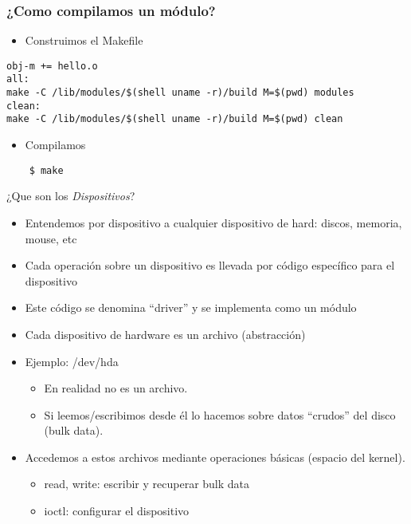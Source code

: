 \begin{frame}[fragile]
\frametitle{¿Como compilamos un módulo?}
  \begin{itemize}
  \item Construimos el Makefile
  \end{itemize}
\begin{lstlisting}
obj-m += hello.o
all:
make -C /lib/modules/$(shell uname -r)/build M=$(pwd) modules
clean:
make -C /lib/modules/$(shell uname -r)/build M=$(pwd) clean
\end{lstlisting}
  \begin{itemize}
  \item Compilamos
  \end{itemize}
\begin{lstlisting}
    $ make
\end{lstlisting}

\end{frame}

\begin{frame}{¿Que son los \textit{Dispositivos}?}
  \begin{itemize}
	\item Entendemos por dispositivo a cualquier dispositivo de hard: discos, memoria, mouse, etc
	\item Cada operación sobre un dispositivo es llevada por código específico para el dispositivo
	\item Este código se denomina “driver” y se implementa como un módulo
        \item Cada dispositivo de hardware es un archivo (abstracción)
 	\item Ejemplo: /dev/hda
	\begin{itemize}
		\item En realidad no es un archivo.
		\item Si leemos/escribimos desde él lo hacemos sobre datos “crudos” del disco (bulk data).
	\end{itemize}
         \item Accedemos a estos archivos mediante operaciones básicas (espacio del kernel).
	\begin{itemize}
		\item read, write: escribir y recuperar bulk data
		\item ioctl: configurar el dispositivo 

	\end{itemize}
  \end{itemize}
\end{frame}


